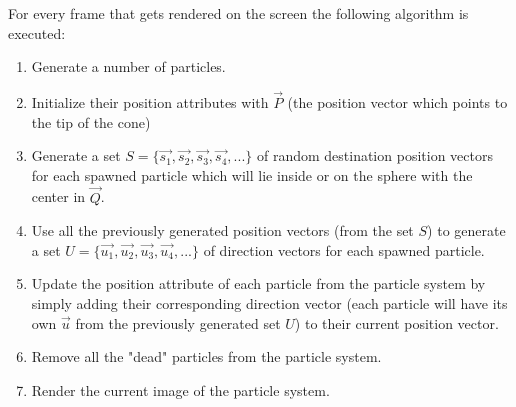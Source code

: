 For every frame that gets rendered on the screen the following algorithm is executed:

\begin{enumerate}
	\item Generate a number of particles.
	
	\item Initialize their position attributes with $\vec{P}$ (the position vector which points to the tip of the cone)
	
	\item Generate a set $S = \{\vec{s_1}, \vec{s_2}, \vec{s_3}, \vec{s_4}, ...\}$ of random destination position vectors for each spawned particle which will lie inside or on the sphere with the center in $\vec{Q}$.
	
	\item Use all the previously generated position vectors (from the set $S$) to generate a set $U = \{\vec{u_1}, \vec{u_2}, \vec{u_3}, \vec{u_4}, ...\}$ of direction vectors for each spawned particle.
	
	\item Update the position attribute of each particle from the particle system by simply adding their corresponding direction vector (each particle will have its own $\vec{u}$ from the previously generated set $U$) to their current position vector.
	
	\item Remove all the "dead" particles from the particle system.
	
	\item Render the current image of the particle system.
\end{enumerate}